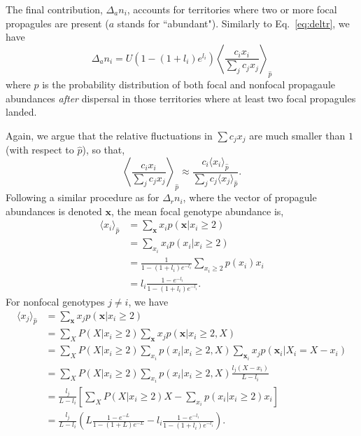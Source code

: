 \documentclass[11pt]{article}
\begin{document}
The final contribution, $\Delta_a n_i$, accounts for territories where two or more focal propagules are present ($a$ stands for ``abundant"). Similarly to Eq.~\eqref{eq:deltr}, we have 
\begin{equation}
\Delta_a n_i=U(1-(1+l_i)e^{l_i})\left\langle \frac{c_i x_i}{\sum_j c_j x_j} \right\rangle_{\hat{p}}\label{eq:delta}
\end{equation}
where $\hat{p}$ is the probability distribution of both focal and nonfocal propagaule abundances \textit{after} dispersal in those territories where at least two focal propagules landed. 

Again, we argue that the relative fluctuations in $\sum c_j x_j$ are much smaller than $1$ (with respect to $\hat{p}$), so that,
\begin{equation}
\left\langle \frac{c_i x_i}{\sum_j c_j x_j} \right\rangle_{\hat{p}}\approx  \frac{c_i \langle x_i \rangle_{\hat{p}}}{\sum_j c_j \langle x_j\rangle_{\hat{p}}}.\label{eq:meanfielda}
\end{equation}
Following a similar procedure as for $\Delta_r n_i$, where the vector of propagule abundances is denoted ${\mathbf x}$, the mean focal genotype abundance is, 
\begin{align}
\langle x_i \rangle_{\hat{p}}&=\sum_{\mathbf x} x_i p(\mathbf x|x_i\geq 2)\nonumber \\
&=\sum_{x_i} x_i p(x_i|x_i\geq 2) \nonumber\\
&=\frac{1}{1-(1+l_i)e^{-l_i}}\sum_{x_i\geq 2} p(x_i)x_i\nonumber\\
&=l_i\frac{1-e^{-l_i}}{1-(1+l_i)e^{-l_i}}.
\end{align}
For nonfocal genotypes $j\neq i$, we have
\begin{align}
\langle x_j \rangle_{\hat{p}}&=\sum_{\mathbf x} x_j p(\mathbf x|x_i\geq 2)\nonumber \\
&=\sum_{X}P(X|x_i\geq 2)\sum_{\mathbf x} x_j p({\mathbf x}|x_i\geq 2,X)\nonumber\\
&=\sum_{X}P(X|x_i\geq 2)\sum_{x_i} p(x_i|x_i\geq 2,X) \sum_{\mathbf x_i} x_j p(\mathbf x_i|X_i=X-x_i)\nonumber\\
&=\sum_{X}P(X|x_i\geq 2)\sum_{x_i}p(x_i|x_i\geq 2,X) \frac{l_j(X-x_i)}{L-l_i} \nonumber\\
&=\frac{l_j}{L-l_i}\left[\sum_{X}P(X|x_i\geq 2)X - \sum_{x_i}p(x_i|x_i\geq 2) x_i \right]\nonumber\\
&=\frac{l_j}{L-l_i}\left( L\frac{1-e^{-L}}{1-(1+L)e^{-L}}- l_i\frac{1-e^{-l_i}}{1-(1+l_i)e^{-l_i}}\right). 
\end{align}
\end{document}
